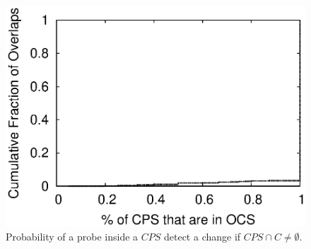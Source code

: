 

\begin{figure}
\begin{center}
\includegraphics[width=0.8\columnwidth]{figs/patching/overlapcoverage/overlapcoverage_only_lczd.eps}
\caption{Probability of a probe inside a $CPS$ detect a change if $CPS \cap C \ne \emptyset$.}
\label{fig:lczd.intersection}
\end{center}
%
\end{figure}
